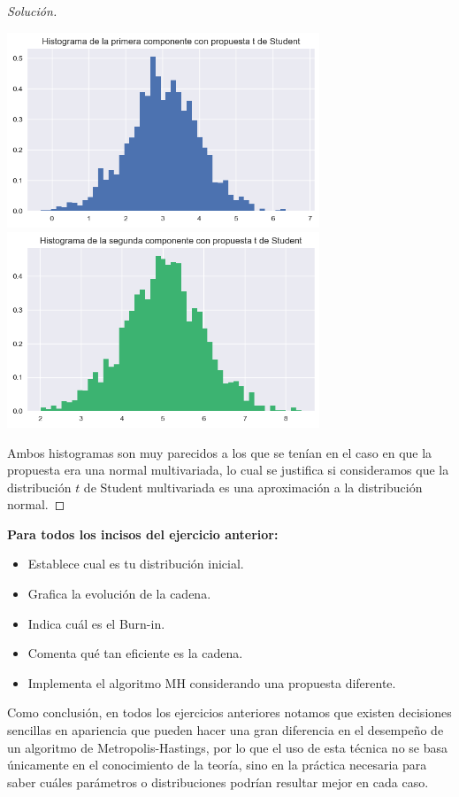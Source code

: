 \documentclass{article}
\begin{document}
\begin{enumerate}
\begin{proof}[Solución]
        \begin{center}
            \includegraphics[width=0.7\textwidth]{tarea7/histrwt1.png}
            \includegraphics[width=0.7\textwidth]{tarea7/histrwt2.png}
        \end{center}

        Ambos histogramas son muy parecidos a los que se tenían en el caso en que la propuesta era 
        una normal multivariada, lo cual se justifica si consideramos que la distribución $t$ de Student
        multivariada es una aproximación a la distribución normal.
    \end{proof}



\textbf{Para todos los incisos del ejercicio anterior:}


\begin{itemize}
    \item Establece cual es tu distribución inicial.
    \item Grafica la evolución de la cadena.
    \item Indica cuál es el Burn-in.
    \item Comenta qué tan eficiente es la cadena.
    \item Implementa el algoritmo MH considerando una propuesta diferente.
\end{itemize}

Como conclusión, en todos los ejercicios anteriores notamos que existen decisiones 
sencillas en apariencia que pueden hacer una gran diferencia en el desempeño de un 
algoritmo de Metropolis-Hastings, por lo que el uso de esta técnica no se basa únicamente
en el conocimiento de la teoría, sino en la práctica necesaria para saber cuáles 
parámetros o distribuciones podrían resultar mejor en cada caso.

\end{enumerate}





 
\end{document}
